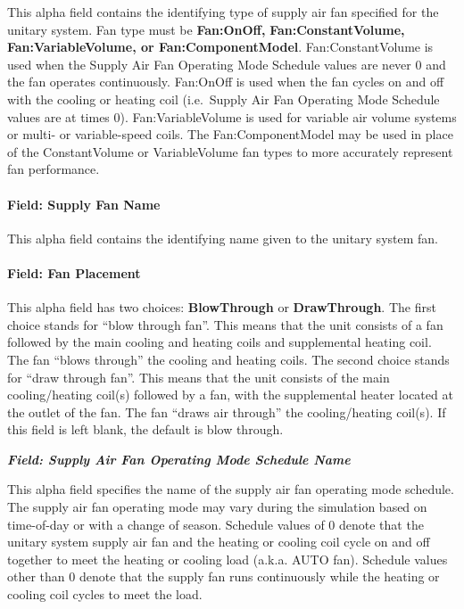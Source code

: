 This alpha field contains the identifying type of supply air fan specified for the unitary system. Fan type must be \textbf{Fan:OnOff,} \textbf{Fan:ConstantVolume, Fan:VariableVolume, or Fan:ComponentModel}. Fan:ConstantVolume is used when the Supply Air Fan Operating Mode Schedule values are never 0 and the fan operates continuously. Fan:OnOff is used when the fan cycles on and off with the cooling or heating coil (i.e.~Supply Air Fan Operating Mode Schedule values are at times 0). Fan:VariableVolume is used for variable air volume systems or multi- or variable-speed coils. The Fan:ComponentModel may be used in place of the ConstantVolume or VariableVolume fan types to more accurately represent fan performance.

\paragraph{Field: Supply Fan Name}\label{field-supply-fan-name}

This alpha field contains the identifying name given to the unitary system fan.

\paragraph{Field: Fan Placement}\label{field-fan-placement}

This alpha field has two choices: \textbf{BlowThrough} or \textbf{DrawThrough}. The first choice stands for ``blow through fan''. This means that the unit consists of a fan followed by the main cooling and heating coils and supplemental heating coil. The fan ``blows through'' the cooling and heating coils. The second choice stands for ``draw through fan''. This means that the unit consists of the main cooling/heating coil(s) followed by a fan, with the supplemental heater located at the outlet of the fan. The fan ``draws air through'' the cooling/heating coil(s). If this field is left blank, the default is blow through.

\textbf{\emph{Field: Supply Air Fan Operating Mode Schedule Name}}

This alpha field specifies the name of the supply air fan operating mode schedule. The supply air fan operating mode may vary during the simulation based on time-of-day or with a change of season. Schedule values of 0 denote that the unitary system supply air fan and the heating or cooling coil cycle on and off together to meet the heating or cooling load (a.k.a. AUTO fan). Schedule values other than 0 denote that the supply fan runs continuously while the heating or cooling coil cycles to meet the load.

